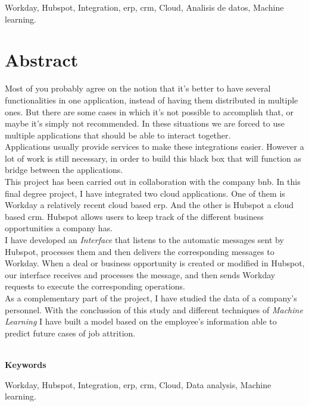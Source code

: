     Workday, Hubspot, Integration, \acrfull{erp}, \acrfull{crm}, Cloud, Analisis de datos, Machine learning.


\chapter*{Abstract}
	
	Most of you probably agree on the notion that it’s better to have several functionalities in one application, instead of having them distributed in multiple ones. But there are some cases in which
	it’s not possible to accomplish that, or maybe it's simply not recommended. In these situations we are
	forced to use multiple applications that should be able to interact together.\\

	Applications usually provide services to make these integrations easier. However a lot of work is still necessary, in order to build this black box that will function as bridge between the applications.\\
	
	This project has been carried out in collaboration with the company \acrfull{bnb}. In this final degree project, I have integrated two cloud applications. One of
	them is Workday a relatively recent cloud based \acrshort{erp}. And the other is Hubspot a cloud based \acrshort{crm}.
	Hubspot allows users to keep track of the different business opportunities a company has.\\
	
	I have developed an \textit{Interface} that listens to the automatic messages sent by Hubspot,
	processes them and then delivers the corresponding messages to Workday. When a deal or business
	opportunity is created or modified in Hubspot, our interface receives and processes the message, and then sends Workday requests to execute the corresponding operations.\\

	As a complementary part of the project, I have studied the data of a company’s personnel. 
	With the conclussion of this study and different techniques of \textit{Machine Learning} I have
	built a model based on the employee's information able to predict future cases of job attrition.\\

	
	
	
	\
	
	\textbf{Keywords}
    
    Workday, Hubspot, Integration, \acrfull{erp}, \acrfull{crm}, Cloud, Data analysis, Machine learning.
	
	
